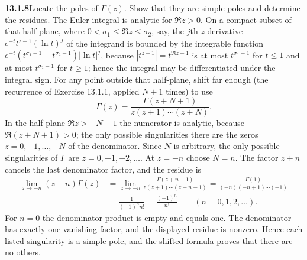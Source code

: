 \par\bigskip
\noindent\textbf{13.1.8}\quad Locate the poles of $\Gamma(z)$. Show that they
are simple poles and determine the residues.
\solution
The Euler integral is analytic for $\Re z>0$.  On a compact subset
of that half-plane, where $0<\sigma_1\le\Re z\le\sigma_2$, say, the
$j$th $z$-derivative $e^{-t}t^{z-1}(\ln t)^j$ of the integrand is
bounded by the integrable function
$e^{-t}(t^{\sigma_1-1}+t^{\sigma_2-1})|\ln t|^j$, because
$|t^{z-1}|=t^{\Re z-1}$ is at most $t^{\sigma_1-1}$ for $t\le1$ and
at most $t^{\sigma_2-1}$ for $t\ge1$; hence the integral may be
differentiated under the integral sign.
For any point outside that half-plane, shift far enough
(the recurrence of Exercise 13.1.1, applied $N+1$ times) to use
\[
\Gamma(z)=\frac{\Gamma(z+N+1)}{z(z+1)\cdots(z+N)}.
\]
In the half-plane $\Re z>-N-1$ the numerator is analytic, because
$\Re(z+N+1)>0$; the only possible singularities there are the zeros
$z=0,-1,\ldots,-N$ of the denominator.  Since $N$ is arbitrary, the
only possible singularities of $\Gamma$ are $z=0,-1,-2,\ldots$.
At $z=-n$ choose $N=n$.  The factor $z+n$ cancels the last
denominator factor, and the residue is
\begin{align*}
\lim_{z\to-n}(z+n)\Gamma(z)
&=\lim_{z\to-n}\frac{\Gamma(z+n+1)}{z(z+1)\cdots(z+n-1)}
=\frac{\Gamma(1)}{(-n)(-n+1)\cdots(-1)}\\
&=\frac1{(-1)^nn!}
=\boxed{\frac{(-1)^n}{n!}}\qquad(n=0,1,2,\ldots).
\end{align*}
For $n=0$ the denominator product is empty and equals one.
The denominator has exactly one vanishing factor, and the displayed
residue is nonzero.  Hence each listed singularity is a simple pole,
and the shifted formula proves that there are no others.


